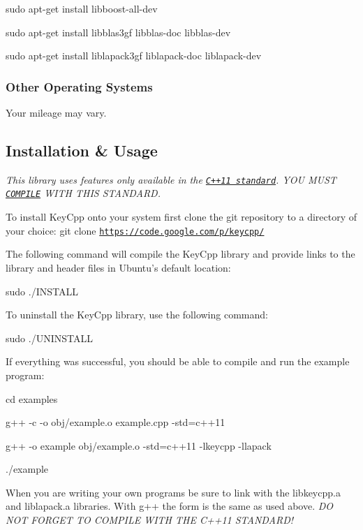 {\ttfamily sudo apt-\/get install libboost-\/all-\/dev}

{\ttfamily sudo apt-\/get install libblas3gf libblas-\/doc libblas-\/dev}

{\ttfamily sudo apt-\/get install liblapack3gf liblapack-\/doc liblapack-\/dev}

\subsubsection*{Other Operating Systems}

Your mileage may vary.

\subsection*{Installation \& Usage}

{\itshape This library uses features only available in the \href{https://en.wikipedia.org/wiki/C%2B%2B11}{\tt C++11 standard}. Y\-O\-U M\-U\-S\-T \href{http://gcc.gnu.org/projects/cxx0x.html}{\tt C\-O\-M\-P\-I\-L\-E} W\-I\-T\-H T\-H\-I\-S S\-T\-A\-N\-D\-A\-R\-D.}

To install Key\-Cpp onto your system first clone the git repository to a directory of your choice\-: {\ttfamily git clone \href{https://code.google.com/p/keycpp/}{\tt https\-://code.\-google.\-com/p/keycpp/}}

The following command will compile the Key\-Cpp library and provide links to the library and header files in Ubuntu's default location\-:

{\ttfamily sudo ./\-I\-N\-S\-T\-A\-L\-L}

To uninstall the Key\-Cpp library, use the following command\-:

{\ttfamily sudo ./\-U\-N\-I\-N\-S\-T\-A\-L\-L}

If everything was successful, you should be able to compile and run the example program\-:

{\ttfamily cd examples}

{\ttfamily g++ -\/c -\/o obj/example.\-o example.\-cpp -\/std=c++11}

{\ttfamily g++ -\/o example obj/example.\-o -\/std=c++11 -\/lkeycpp -\/llapack}

{\ttfamily ./example}

When you are writing your own programs be sure to link with the {\ttfamily libkeycpp.\-a} and {\ttfamily liblapack.\-a} libraries. With {\ttfamily g++} the form is the same as used above. {\itshape D\-O N\-O\-T F\-O\-R\-G\-E\-T T\-O C\-O\-M\-P\-I\-L\-E W\-I\-T\-H T\-H\-E C++11 S\-T\-A\-N\-D\-A\-R\-D!}


